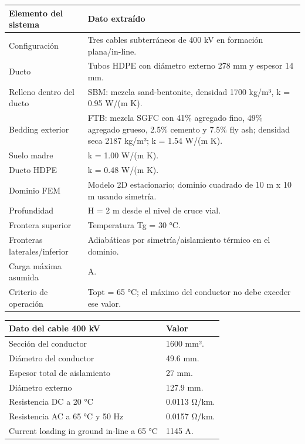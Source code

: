 \documentclass[11pt,a4paper,oneside]{report}
\newcounter{none}
\begin{document}
{\def\LTcaptype{none} %
\begin{longtable}[]{@{}
  >{\raggedright\arraybackslash}p{}
  >{\raggedright\arraybackslash}p{}@{}}
\toprule\noalign{}
\begin{minipage}[b]{\linewidth}\raggedright
Elemento del sistema
\end{minipage} & \begin{minipage}[b]{\linewidth}\raggedright
Dato extraído
\end{minipage} \\
\midrule\noalign{}
\endhead
\bottomrule\noalign{}
\endlastfoot
Configuración & Tres cables subterráneos de 400 kV en formación
plana/in-line. \\
Ducto & Tubos HDPE con diámetro externo 278 mm y espesor 14 mm. \\
Relleno dentro del ducto & SBM: mezcla sand-bentonite, densidad 1700
kg/m³, k = 0.95 W/(m K). \\
Bedding exterior & FTB: mezcla SGFC con 41\% agregado fino, 49\%
agregado grueso, 2.5\% cemento y 7.5\% fly ash; densidad seca 2187
kg/m³; k = 1.54 W/(m K). \\
Suelo madre & k = 1.00 W/(m K). \\
Ducto HDPE & k = 0.48 W/(m K). \\
Dominio FEM & Modelo 2D estacionario; dominio cuadrado de 10 m x 10 m
usando simetría. \\
Profundidad & H = 2 m desde el nivel de cruce vial. \\
Frontera superior & Temperatura Tg = 30 °C. \\
Fronteras laterales/inferior & Adiabáticas por simetría/aislamiento
térmico en el dominio. \\
Carga máxima asumida & 1145 A. \\
Criterio de operación & Topt = 65 °C; el máximo del conductor no debe
exceder ese valor. \\
\end{longtable}
}

{\def\LTcaptype{none} %
\begin{longtable}[]{@{}ll@{}}
\toprule\noalign{}
Dato del cable 400 kV & Valor \\
\midrule\noalign{}
\endhead
\bottomrule\noalign{}
\endlastfoot
Sección del conductor & 1600 mm². \\
Diámetro del conductor & 49.6 mm. \\
Espesor total de aislamiento & 27 mm. \\
Diámetro externo & 127.9 mm. \\
Resistencia DC a 20 °C & 0.0113 Ω/km. \\
Resistencia AC a 65 °C y 50 Hz & 0.0157 Ω/km. \\
Current loading in ground in-line a 65 °C & 1145 A. \\
\end{longtable}
}
\end{document}
